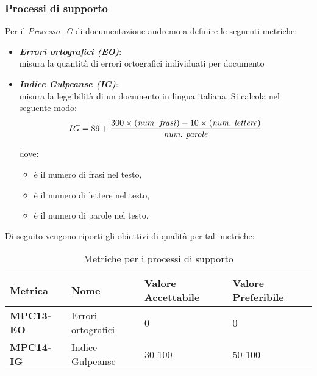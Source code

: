 \subsubsection{Processi di supporto}
Per il \textit{Processo_G} di documentazione andremo a definire le seguenti metriche:
\begin{itemize}
    \item \textbf{\emph{Errori ortografici (EO)}}:\\
    misura la quantità di errori ortografici individuati per documento
    \item \textbf{\emph{Indice Gulpeanse (IG)}}:\\
    misura la leggibilità di un documento in lingua italiana. Si calcola nel seguente modo:
    \[
    IG = 89 + \frac{300 \times (\text{{\emph{num.\ frasi}}}) - 10 \times (\text{\emph{{num.\ lettere}}})}{\text{\emph{{num.\ parole}}}}
    \]

    dove:
    \begin{itemize}
        \item {} \`e il numero di frasi nel testo,
        \item {} \`e il numero di lettere nel testo,
        \item {} \`e il numero di parole nel testo.
    \end{itemize}
    \end{itemize}
Di seguito vengono riporti gli obiettivi di qualità per tali metriche:
\begin{table}[htbp]
    \centering
    \begin{tabular}{|>{\centering\arraybackslash}p{4cm}|p{4cm}|p{4cm}|p{4cm}|}
    \hline
    \rowcolor{gray!30}
    \textbf{Metrica} & \textbf{Nome} & \textbf{Valore Accettabile} & \textbf{Valore Preferibile} \\
    \hline
    \rowcolor{gray!10}
    \textbf{MPC13-EO} & Errori ortografici & 0 & 0 \\
    \hline
    \textbf{MPC14-IG} & Indice Gulpeanse & 30-100 & 50-100 \\
    \hline
    \end{tabular}
    \caption{Metriche per i processi di supporto}
    \label{tab:metriche_fornitura}
\end{table}
